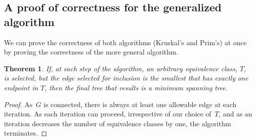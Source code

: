 \documentclass[11pt]{article}
\newtheorem{theorem}{Theorem}
\begin{document}
\subsection{A proof of correctness for the generalized algorithm}
We can prove the correctness of both algorithms (Kruskal's and Prim's)
at once by proving the correctness of the more general algorithm.
\begin{theorem}
  If, at each step of the algorithm, an arbitrary equivalence class, $T$,
  is selected, but the edge selected for inclusion is the smallest that has
  exactly one endpoint in $T$, then the final tree that results is a minimum
  spanning tree.
\end{theorem}
\begin{proof}
  As~$G$ is connected, there is always at least one allowable edge at each
  iteration.  As each iteration can proceed, irrespective of our choice of~$T$,
  and as an iteration decreases the number of equivalence classes by one, the
  algorithm terminates.


\end{proof}
\end{document}
